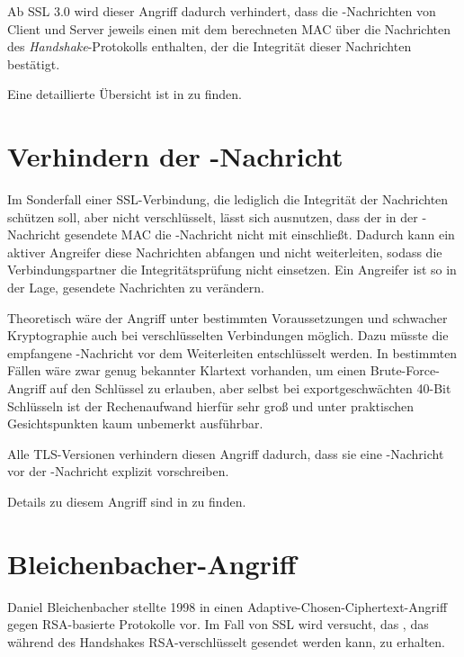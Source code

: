 Ab SSL 3.0 wird dieser Angriff dadurch verhindert, dass die \finished{}-Nachrichten von Client und Server jeweils einen mit dem \mastersecret{} berechneten MAC über die Nachrichten des \emph{Handshake}-Protokolls enthalten, der die Integrität dieser Nachrichten bestätigt.

Eine detaillierte Übersicht ist in \cite{wagner96} zu finden.

\section{Verhindern der \changecipherspec{}-Nachricht}

Im Sonderfall einer SSL-Verbindung, die lediglich die Integrität der Nachrichten schützen soll, aber nicht verschlüsselt, lässt sich ausnutzen, dass der in der \finished{}-Nachricht gesendete MAC die \changecipherspec{}-Nachricht nicht mit einschließt. Dadurch kann ein aktiver Angreifer diese Nachrichten abfangen und nicht weiterleiten, sodass die Verbindungspartner die Integritätsprüfung nicht einsetzen. Ein Angreifer ist so in der Lage, gesendete Nachrichten zu verändern. 

Theoretisch wäre der Angriff unter bestimmten Voraussetzungen und schwacher Kryptographie auch bei verschlüsselten Verbindungen möglich. Dazu müsste die empfangene \finished{}-Nachricht vor dem Weiterleiten entschlüsselt werden. In bestimmten Fällen wäre zwar genug bekannter Klartext vorhanden, um einen Brute-Force-Angriff auf den Schlüssel zu erlauben, aber selbst bei exportgeschwächten 40-Bit Schlüsseln ist der Rechenaufwand hierfür sehr groß und unter praktischen Gesichtspunkten kaum unbemerkt ausführbar.

Alle TLS-Versionen verhindern diesen Angriff dadurch, dass sie eine \changecipherspec{}-Nachricht vor der \finished{}-Nachricht explizit vorschreiben.

Details zu diesem Angriff sind in \cite{wagner96} zu finden.


\section{Bleichenbacher-Angriff}

Daniel Bleichenbacher stellte 1998 in \cite{bleichenbacher98} einen Adaptive-Chosen-Ciphertext-Angriff gegen RSA-basierte Protokolle vor. Im Fall von SSL wird versucht, das \premastersecret{}, das während des Handshakes RSA-verschlüsselt gesendet werden kann, zu erhalten.

